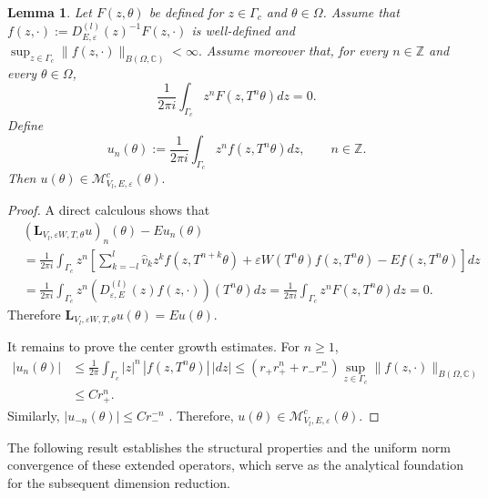 \documentclass[reqno,11pt]{amsart}
\newtheorem{lemma}{Lemma}[section]
\newcommand{\C}{{\mathbb C}}
\begin{document}
\begin{lemma}\label{recons}
 Let $F(z,\theta)$ be defined for
$z\in\Gamma_c$ and $\theta\in\Omega$. Assume that
$
f(z,\cdot):=D^{(l)}_{E,\varepsilon}(z)^{-1}F(z,\cdot) 
$ is well-defined and 
$ \sup_{z\in\Gamma_c}\|f(z,\cdot)\|_{B(\Omega,\C)}<\infty.$
Assume moreover that, for every $n\in\mathbb Z$ and every
$\theta\in\Omega$,
$$
\frac{1}{2\pi i}\int_{\Gamma_c}
z^nF(z,T^n\theta)dz=0.
$$ Define
$$
u_n(\theta):=\frac{1}{2\pi i}\int_{\Gamma_c}
z^n f(z,T^n\theta)dz,
\qquad n\in\mathbb Z.
$$
Then $
u(\theta)\in \mathcal M^c_{V_l,E,\varepsilon}(\theta).
$
\end{lemma}
\begin{proof}
    A direct calculous shows that 
$$
\begin{aligned}
&(\mathbf L_{ V_l,\varepsilon W,T,\theta}u)_n(\theta)-Eu_n(\theta)\\
&=\frac{1}{2\pi i}\int_{\Gamma_c}
z^n\left[
\sum_{k=-l}^{l}\hat v_k z^k
f(z,T^{n+k}\theta)
+\varepsilon W(T^n\theta)f(z,T^n\theta)-
E f(z,T^n\theta)
\right]dz  \\
&=\frac{1}{2\pi i}\int_{\Gamma_c}z^n
\left(D_{\varepsilon,E}^{(l)}(z)f(z,\cdot)
\right)(T^n\theta)
dz=\frac{1}{2\pi i}\int_{\Gamma_c}
z^n F(z,T^n\theta)
dz=0 .
\end{aligned}
$$
Therefore
$
\mathbf L_{V_l,\varepsilon W,T,\theta}u(\theta)=
E u(\theta).
$

It remains to prove the center growth estimates. 
 For $n\ge 1$,
\begin{align*}
|u_n(\theta)|
&\le
\frac{1}{2\pi}\int_{\Gamma_c} |z|^n\,|f(z,T^n\theta)|\,|dz|\le
\left( r_+ r_+^n+ r_- r_-^n\right)
\sup_{z\in\Gamma_c}\|f(z,\cdot)\|_{B(\Omega,\C)}\\ &\leq C r_+^n.
\end{align*}
 Similarly, $|u_{-n}(\theta)|\leq  C r_-^{-n}$ .
 Therefore, $u(\theta)\in \mathcal M^c_{V_l,E,\varepsilon}(\theta).$
\end{proof}

 The following result establishes the structural properties and the uniform norm convergence of these extended operators, which serve as the analytical foundation for the subsequent dimension reduction.
\end{document}

